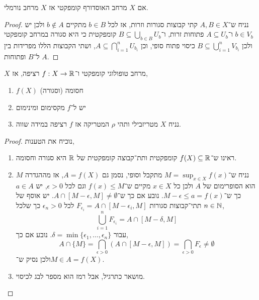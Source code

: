 \begin{proposition}
	אם $X$ מרחב האוסדורף קומפקטי אז $X$ מרחב נורמלי.
\end{proposition}
\begin{proof}
	נניח ש־$A, B \in X$ קתי קבוצות סגורות וזרות, אז לכל $b \in B$ מתקיים $b \notin A$ ולכן יש $b \in V_b$ ו־$A \subseteq U_b$ פתוחות זרות,
	ו־$B \subseteq \bigcup_{b \in B} U_{b}$ קומפקטית כי היא סגורה במרחב קומפקטי ולכן $B \subseteq \bigcup_{i = 1}^n V_{b_i}$ כיסוי פתוח סופי, וכן $A \subseteq \bigcap_{i = 1}^n U_{b_i}$,
	ושתי הקבוצות הללו מפרידות בין $A$ ל־$B$ ופתוחות.
\end{proof}
\begin{proposition}
	$X$ מרחב טופולוגי קומפקטי ו־$f : X \to \mathbb{R}$ רציפה, אז,
	\begin{enumerate}
		\item $f(X)$ חסומה (וסגורה)
		\item יש ל־$f$ מקסימום ומינימום
		\item נניח $X$ מטריזבילי ותהי $\rho$ המטריקה אז $f$ רציפה במידה שווה.
	\end{enumerate}
\end{proposition}
\begin{proof}
	נוכיח את הטענות,
	\begin{enumerate}
		\item ראינו ש־$f(X) \subseteq \mathbb{R}$ קומפקטית ותת־קבוצה קומפקטית של $\mathbb{R}$ היא סגורה וחסומה.
		\item נניח ש־$M = \sup_{x \in X} f(x)$ מתקבל וסופי, נסמן גם $A = f(X)$, אז מההגדרה $M$ הוא הסופרימום של $A$ ולכן כל $x \in X$ מקיים ש־$f(x) \le M$ וגם לכל $\epsilon > 0$,
			יש $a \in A$ כך ש־$M - \epsilon \le a = f(x)$.
			נובע אם כך ש־$A \cap [M - \epsilon, M] \ne \emptyset$.
			יש אוסף של תתי־קבוצות סגורות $F_{\epsilon_i} = A \cap [M - \epsilon_i, M]$ לכל $\epsilon_n > 0$ כך שלכל $n \in \mathbb{N}$,
			\[
				\bigcup_{i = 1}^n F_{\epsilon_i}
				= A \cap [M - \delta, M]
			\]
			עבור $\delta = \min\{ \epsilon_1, \ldots, \epsilon_n \}$.
			נובע אם כך,
			\[
				A \cap \{ M \}
				= \bigcap_{\epsilon > 0} (A \cap [M - \epsilon, M])
				= \bigcap_{\epsilon > 0} F_{\epsilon} \ne \emptyset
			\]
			ולכן נסיק ש־$M \in A = f(X)$.
		\item מושאר כתרגיל, אבל רמז הוא מספר לבג לכיסוי.
	\end{enumerate}
\end{proof}

